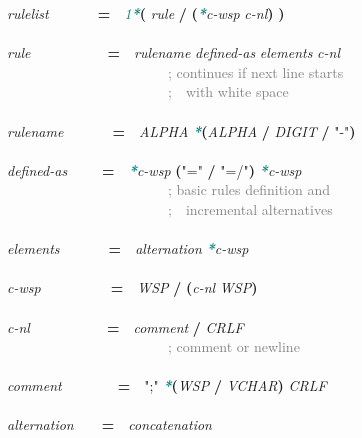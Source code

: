 \documentclass{article}
\begin{document}
{\scriptsize\ttfamily
\emph{rulelist}\mbox{~~~~~~~}\textbf{=}\mbox{~~}\textcolor{teal}{\emph{1\textbf{*}}}\textbf{(} \emph{rule} \textbf{/} \textbf{(}\textcolor{teal}{\emph{\textbf{*}}}\emph{c-{}wsp} \emph{c-{}nl}\textbf{)} \textbf{)}\\
\\
\emph{rule}\mbox{~~~~~~~~~~~}\textbf{=}\mbox{~~}\emph{rulename} \emph{defined-{}as} \emph{elements} \emph{c-{}nl}\\
\mbox{~~~~~~~~~~~~~~~~~~~~~~~}\textcolor{gray}{; continues if next line starts}\\
\mbox{~~~~~~~~~~~~~~~~~~~~~~~}\textcolor{gray}{;\mbox{~~}with white space}\\
\\
\emph{rulename}\mbox{~~~~~~~}\textbf{=}\mbox{~~}\emph{ALPHA} \textcolor{teal}{\emph{\textbf{*}}}\textbf{(}\emph{ALPHA} \textbf{/} \emph{DIGIT} \textbf{/} \textcolor{BrickRed}{"-{}"}\textbf{)}\\
\\
\emph{defined-{}as}\mbox{~~~~~}\textbf{=}\mbox{~~}\textcolor{teal}{\emph{\textbf{*}}}\emph{c-{}wsp} \textbf{(}\textcolor{BrickRed}{"="} \textbf{/} \textcolor{BrickRed}{"=/"}\textbf{)} \textcolor{teal}{\emph{\textbf{*}}}\emph{c-{}wsp}\\
\mbox{~~~~~~~~~~~~~~~~~~~~~~~}\textcolor{gray}{; basic rules definition and}\\
\mbox{~~~~~~~~~~~~~~~~~~~~~~~}\textcolor{gray}{;\mbox{~~}incremental alternatives}\\
\\
\emph{elements}\mbox{~~~~~~~}\textbf{=}\mbox{~~}\emph{alternation} \textcolor{teal}{\emph{\textbf{*}}}\emph{c-{}wsp}\\
\\
\emph{c-{}wsp}\mbox{~~~~~~~~~~}\textbf{=}\mbox{~~}\emph{WSP} \textbf{/} \textbf{(}\emph{c-{}nl} \emph{WSP}\textbf{)}\\
\\
\emph{c-{}nl}\mbox{~~~~~~~~~~~}\textbf{=}\mbox{~~}\emph{comment} \textbf{/} \emph{CRLF}\\
\mbox{~~~~~~~~~~~~~~~~~~~~~~~}\textcolor{gray}{; comment or newline}\\
\\
\emph{comment}\mbox{~~~~~~~~}\textbf{=}\mbox{~~}\textcolor{BrickRed}{";"} \textcolor{teal}{\emph{\textbf{*}}}\textbf{(}\emph{WSP} \textbf{/} \emph{VCHAR}\textbf{)} \emph{CRLF}\\
\\
\emph{alternation}\mbox{~~~~}\textbf{=}\mbox{~~}\emph{concatenation}\\
}
\end{document}

